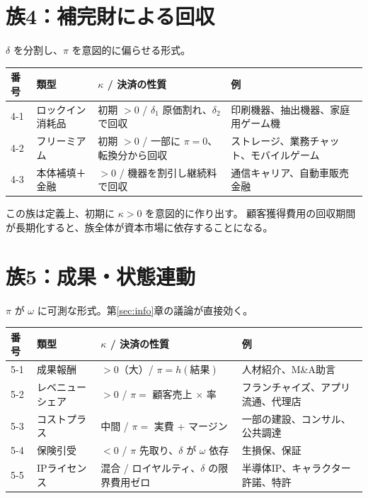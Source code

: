 \section{族4：補完財による回収}

$\delta$ を分割し、$\pi$ を意図的に偏らせる形式。

\begin{center}
\begin{tabularx}{\textwidth}{@{}llXX@{}}
\toprule
番号 & 類型 & $\kappa$ / 決済の性質 & 例 \\
\midrule
4-1 & ロックイン消耗品 & 初期 $>0$ / $\delta_1$ 原価割れ、$\delta_2$ で回収 & 印刷機器、抽出機器、家庭用ゲーム機 \\
4-2 & フリーミアム & 初期 $>0$ / 一部に $\pi=0$、転換分から回収 & ストレージ、業務チャット、モバイルゲーム \\
4-3 & 本体補填＋金融 & $>0$ / 機器を割引し継続料で回収 & 通信キャリア、自動車販売金融 \\
\bottomrule
\end{tabularx}
\label{tab:family-4-catalog}
\end{center}

この族は定義上、初期に $\kappa>0$ を意図的に作り出す。
顧客獲得費用の回収期間が長期化すると、族全体が資本市場に依存することになる。

\section{族5：成果・状態連動}

$\pi$ が $\omega$ に可測な形式。第\ref{sec:info}章の議論が直接効く。

\begin{center}
\begin{tabularx}{\textwidth}{@{}llXX@{}}
\toprule
番号 & 類型 & $\kappa$ / 決済の性質 & 例 \\
\midrule
5-1 & 成果報酬 & $>0$（大）/ $\pi=h(\text{結果})$ & 人材紹介、M\&A助言 \\
5-2 & レベニューシェア & $>0$ / $\pi = $ 顧客売上 $\times$ 率 & フランチャイズ、アプリ流通、代理店 \\
5-3 & コストプラス & 中間 / $\pi = $ 実費 + マージン & 一部の建設、コンサル、公共調達 \\
5-4 & 保険引受 & $<0$ / $\pi$ 先取り、$\delta$ が $\omega$ 依存 & 生損保、保証 \\
5-5 & IPライセンス & 混合 / ロイヤルティ、$\delta$ の限界費用ゼロ & 半導体IP、キャラクター許諾、特許 \\
\bottomrule
\end{tabularx}
\label{tab:family-5-catalog}
\end{center}


